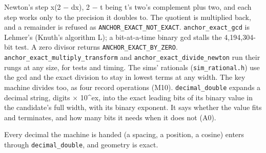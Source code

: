 \begin{description}
Newton's step x(2 − dx), 2 − t being t's two's complement plus two, and each step works only to the precision it doubles to. The quotient is multiplied back, and a remainder is refused as \texttt{ANCHOR\_\allowbreak{}EXACT\_\allowbreak{}NOT\_\allowbreak{}EXACT}. \texttt{anchor\_\allowbreak{}exact\_\allowbreak{}gcd} is Lehmer's (Knuth's algorithm L); a bit-at-a-time binary gcd stalls the 4,194,304-bit test. A zero divisor returns \texttt{ANCHOR\_\allowbreak{}EXACT\_\allowbreak{}BY\_\allowbreak{}ZERO}. \texttt{anchor\_\allowbreak{}exact\_\allowbreak{}multiply\_\allowbreak{}transform} and \texttt{anchor\_\allowbreak{}exact\_\allowbreak{}divide\_\allowbreak{}newton} run their rungs at any size, for tests and timing. The sims' rationals (\texttt{sim\_\allowbreak{}rational.\allowbreak{}h}) use the gcd and the exact division to stay in lowest terms at any width. The key machine divides too, as four record operations (M10). \texttt{decimal\_\allowbreak{}double} expands a decimal string, digits × 10\textasciicircum{}ex, into the exact leading bits of its binary value in the candidate's full width, with its binary exponent. It says whether the value fits and terminates, and how many bits it needs when it does not (A0).
\item[{wants}] Every decimal the machine is handed (a spacing, a position, a cosine) enters through \texttt{decimal\_\allowbreak{}double}, and geometry is exact.

\end{description}
